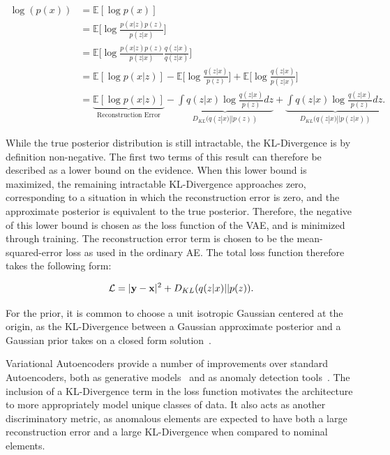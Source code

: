 \documentclass[11pt, a4paper]{article}
\begin{document}
\begin{equation}
	\begin{split}
		\log(p(x))  &= \mathbb{E}[\log p(x)] \\
  		&= \mathbb{E}\bigg[\log \frac{p(x|z)p(z)}{p(z|x)}\bigg] \\
  		&= \mathbb{E}\bigg[\log \frac{p(x|z)p(z)}{p(z|x)} \frac{q(z|x)}{q(z|x)}\bigg] \\
  		&= \mathbb{E}[\log p(x|z)] - \mathbb{E}\bigg[\log \frac{q(z|x)}{p(z)}\bigg] + \mathbb{E} \bigg[\log \frac{q(z|x)}{p(z|x)}\bigg] \\
  		&= \underbrace{\mathbb{E}[\log p(x|z)]}_\text{Reconstruction Error} - \underbrace{\int q(z|x)\log \frac{q(z|x)}{p(z)}dz}_{D_{KL}(q(z|x)||p(z))} + \underbrace{\int q(z|x)\log \frac{q(z|x)}{p(z)}dz.}_{D_{KL}(q(z|x)||p(z|x))}
  \end{split}
\end{equation} 

While the true posterior distribution is still intractable, the KL-Divergence is by definition non-negative. The first two terms of this result can therefore be described as a lower bound on the evidence. 
When this lower bound is maximized, the remaining intractable KL-Divergence approaches zero, corresponding to a situation in which the reconstruction error is zero, and the approximate posterior is equivalent to the true posterior. 
Therefore, the negative of this lower bound is chosen as the loss function of the VAE, and is minimized through training. 
The reconstruction error term is chosen to be the mean-squared-error loss as used in the ordinary AE. 
The total loss function therefore takes the following form: 

\begin{equation}
	\mathcal{L} = |{\textbf y} - {\textbf x}|^{2} + D_{KL}(q(z|x)||p(z)).
\end{equation} 


For the prior, it is common to choose a unit isotropic Gaussian centered at the origin, as the KL-Divergence between a Gaussian approximate posterior and a Gaussian prior takes on a closed form solution~\cite{Goodfellow-et-al-2016}.



Variational Autoencoders provide a number of improvements over standard Autoencoders, both as generative models~\cite{kingma2014autoencoding} and as anomaly detection tools~\cite{An2015VariationalAB}. The inclusion of a KL-Divergence term in the loss function motivates the architecture to more appropriately model unique classes of data. It also acts as another discriminatory metric, as anomalous elements are expected to have both a large reconstruction error and a large KL-Divergence when compared to nominal elements.
\end{document}
